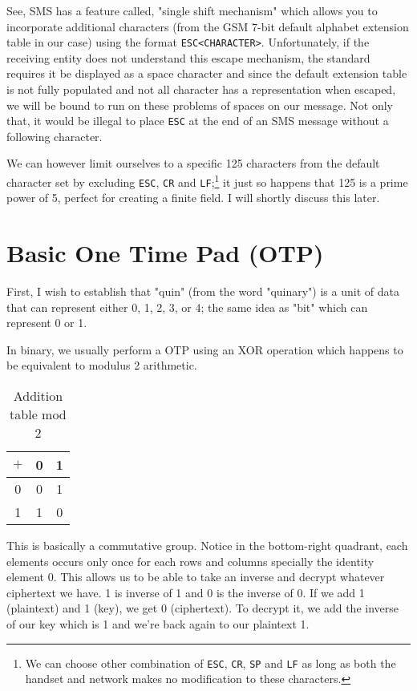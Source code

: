 \documentclass{article}
\begin{document}
See, SMS has a feature called, 
"single shift mechanism" which allows you to incorporate additional
characters (from the GSM 7-bit default alphabet extension table in our case) using the format
\verb+ESC<CHARACTER>+.
Unfortunately, if the receiving entity does not understand this escape mechanism,
the standard requires it be displayed as a space character and since the default extension table is not
fully populated and not all character has a representation when escaped,
we will be bound to run on these problems of spaces on our message. Not only that, it would be illegal to place \verb+ESC+ at the end of an SMS message without a following character.

We can however limit ourselves to a specific 125 characters from the default character set by excluding \verb+ESC+, \verb+CR+ and \verb+LF+;\footnote{We can choose other combination of \texttt{ESC}, \texttt{CR}, \texttt{SP} and \texttt{LF} as long as both the handset and network makes no modification to
these characters.}
it just so happens that 125 is a prime power of 5, perfect for creating a finite field. I will
shortly discuss this later.


\section{Basic One Time Pad (OTP)}

First, I wish to establish that "quin" (from the word "quinary") is a unit
of data that can represent either 0, 1, 2, 3, or 4; the same idea as "bit" which
can represent 0 or 1.

In binary, we usually perform a OTP using an XOR operation which happens to be equivalent
to modulus 2 arithmetic.

\medskip

\begin{table}[!hp]
\centering
\begin{tabular}{c|cc}
  $+$ & 0 & 1 \\
  \hline
  0 & 0 & 1 \\
  1 & 1 & 0 \\
\end{tabular}
  \caption{Addition table mod 2}
\end{table}

\medskip

This is basically a commutative group. Notice in the bottom-right quadrant, each elements occurs
only once for each rows and columns specially the identity element 0. This
allows us to be able to take an inverse and decrypt whatever ciphertext we
have. 1 is inverse of 1 and 0 is the inverse of 0. If we add 1 (plaintext)
and 1 (key), we get 0 (ciphertext). To decrypt it, we add the inverse
of our key which is 1 and we're back again to our plaintext 1.
\end{document}
